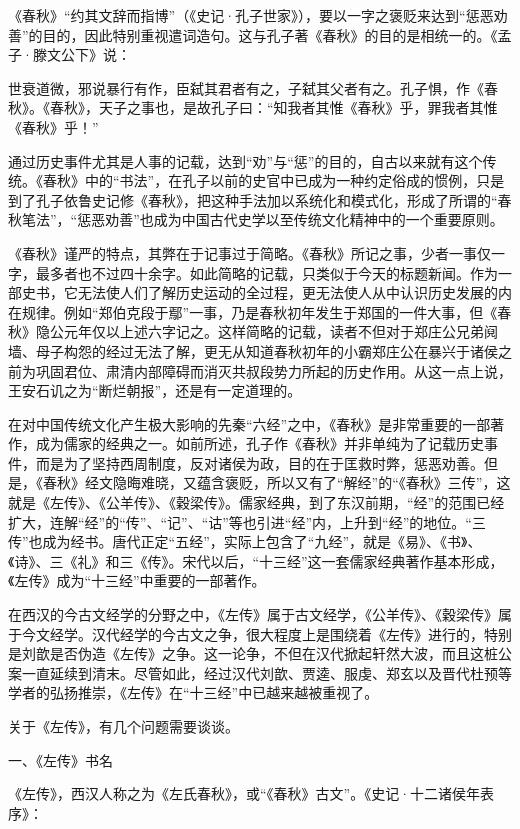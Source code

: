\documentclass[a4paper,12pt,UTF8,twoside]{ctexbook}
\begin{document}
《春秋》“约其文辞而指博”（《史记·孔子世家》），要以一字之褒贬来达到“惩恶劝善”的目的，因此特别重视遣词造句。这与孔子著《春秋》的目的是相统一的。《孟子·滕文公下》说：

世衰道微，邪说暴行有作，臣弑其君者有之，子弑其父者有之。孔子惧，作《春秋》。《春秋》，天子之事也，是故孔子曰：“知我者其惟《春秋》乎，罪我者其惟《春秋》乎！”

通过历史事件尤其是人事的记载，达到“劝”与“惩”的目的，自古以来就有这个传统。《春秋》中的“书法”，在孔子以前的史官中已成为一种约定俗成的惯例，只是到了孔子依鲁史记修《春秋》，把这种手法加以系统化和模式化，形成了所谓的“春秋笔法”，“惩恶劝善”也成为中国古代史学以至传统文化精神中的一个重要原则。

《春秋》谨严的特点，其弊在于记事过于简略。《春秋》所记之事，少者一事仅一字，最多者也不过四十余字。如此简略的记载，只类似于今天的标题新闻。作为一部史书，它无法使人们了解历史运动的全过程，更无法使人从中认识历史发展的内在规律。例如“郑伯克段于鄢”一事，乃是春秋初年发生于郑国的一件大事，但《春秋》隐公元年仅以上述六字记之。这样简略的记载，读者不但对于郑庄公兄弟阋墙、母子构怨的经过无法了解，更无从知道春秋初年的小霸郑庄公在暴兴于诸侯之前为巩固君位、肃清内部障碍而消灭共叔段势力所起的历史作用。从这一点上说，王安石讥之为“断烂朝报”，还是有一定道理的。

在对中国传统文化产生极大影响的先秦“六经”之中，《春秋》是非常重要的一部著作，成为儒家的经典之一。如前所述，孔子作《春秋》并非单纯为了记载历史事件，而是为了坚持西周制度，反对诸侯为政，目的在于匡救时弊，惩恶劝善。但是，《春秋》经文隐晦难晓，又蕴含褒贬，所以又有了“解经”的“《春秋》三传”，这就是《左传》、《公羊传》、《穀梁传》。儒家经典，到了东汉前期，“经”的范围已经扩大，连解“经”的“传”、“记”、“诂”等也引进“经”内，上升到“经”的地位。“三传”也成为经书。唐代正定“五经”，实际上包含了“九经”，就是《易》、《书》、《诗》、三《礼》和三《传》。宋代以后，“十三经”这一套儒家经典著作基本形成，《左传》成为“十三经”中重要的一部著作。

在西汉的今古文经学的分野之中，《左传》属于古文经学，《公羊传》、《穀梁传》属于今文经学。汉代经学的今古文之争，很大程度上是围绕着《左传》进行的，特别是刘歆是否伪造《左传》之争。这一论争，不但在汉代掀起轩然大波，而且这桩公案一直延续到清末。尽管如此，经过汉代刘歆、贾逵、服虔、郑玄以及晋代杜预等学者的弘扬推崇，《左传》在“十三经”中已越来越被重视了。

关于《左传》，有几个问题需要谈谈。

一、《左传》书名

《左传》，西汉人称之为《左氏春秋》，或“《春秋》古文”。《史记·十二诸侯年表序》：
\end{document}
